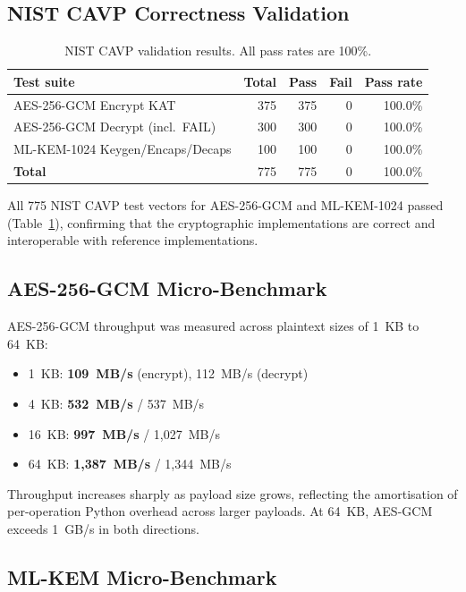 \documentclass[twocolumn]{article}
\begin{document}
\subsection{NIST CAVP Correctness Validation}

\begin{table}[t]
\caption{NIST CAVP validation results. All pass rates are 100\%.}
\label{tab:cavp}
\centering\small
\begin{tabular}{lrrrr}
\toprule
Test suite & Total & Pass & Fail & Pass rate \\
\midrule
AES-256-GCM Encrypt KAT & 375 & 375 & 0 & 100.0\% \\
AES-256-GCM Decrypt (incl.\ FAIL) & 300 & 300 & 0 & 100.0\% \\
ML-KEM-1024 Keygen/Encaps/Decaps & 100 & 100 & 0 & 100.0\% \\
\midrule
\textbf{Total} & 775 & 775 & 0 & 100.0\% \\
\bottomrule
\end{tabular}
\end{table}

All 775 NIST CAVP test vectors for AES-256-GCM and ML-KEM-1024 passed
(Table~\ref{tab:cavp}), confirming that the cryptographic implementations are
correct and interoperable with reference implementations.

\subsection{AES-256-GCM Micro-Benchmark}

AES-256-GCM throughput was measured across plaintext sizes of 1~KB to 64~KB:

\begin{itemize}
  \item 1~KB: \textbf{109~MB/s} (encrypt), 112~MB/s (decrypt)
  \item 4~KB: \textbf{532~MB/s} / 537~MB/s
  \item 16~KB: \textbf{997~MB/s} / 1,027~MB/s
  \item 64~KB: \textbf{1,387~MB/s} / 1,344~MB/s
\end{itemize}

Throughput increases sharply as payload size grows, reflecting the amortisation
of per-operation Python overhead across larger payloads. At 64~KB, AES-GCM
exceeds 1~GB/s in both directions.

\subsection{ML-KEM Micro-Benchmark}
\end{document}
